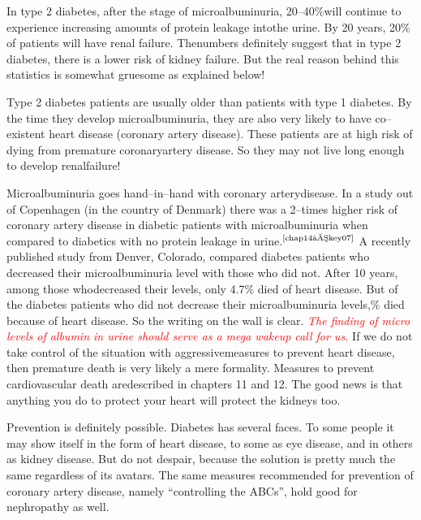 In type 2 diabetes, after the stage of microalbuminuria, 20–40\%\break will continue to experience increasing amounts of protein leakage into\break the urine. By 20 years, 20\% of patients will have renal failure. The\break numbers definitely suggest that in type 2 diabetes, there is a lower risk of kidney failure. But the real reason behind this statistics is somewhat gruesome as explained below!

Type 2 diabetes patients are usually older than patients with type 1 diabetes. By the time they develop microalbuminuria, they are also very likely to have co–existent heart disease (coronary artery disease). These patients are at high risk of dying from premature coronary\break artery disease. So they may not live long enough to develop renal\break failure!

Microalbuminuria goes hand–in–hand with coronary artery\break disease. In a study out of Copenhagen (in the country of Denmark) there was a 2–times higher risk of coronary artery disease in diabetic patients with microalbuminuria when compared to diabetics with no protein lea\-kage in urine.$^{\text{\cite{chap14–key07}}}$ A recently published study from Denver, Colorado, compared diabetes patients who decreased their microalbuminuria level with those who did not. After 10 years, among those who\break decreased their levels, only 4.7\% died of heart disease. But of the dia\-betes patients who did not decrease their microalbuminuria levels,\% died because of heart disease. So the writing on the wall is clear. \textcolor{red}{\textit{The finding of micro levels of albumin in urine should serve as a mega wakeup call for us.}} If we do not take control of the situation with aggressive\break measures to prevent heart disease, then premature death is very likely a mere formality. Measures to prevent cardiovascular death are\break des\-cribed in chapters 11 and 12. The good news is that anything you do to protect your heart will protect the kidneys too.


Prevention is definitely possible. Diabetes has several faces. To some people it may show itself in the form of heart disease, to some as eye disease, and in others as kidney disease. But do not despair, because the solution is pretty much the same regardless of its avatars. The same measures recommended for prevention of coronary artery disease, namely “controlling the ABCs”, hold good for nephropathy as well.

